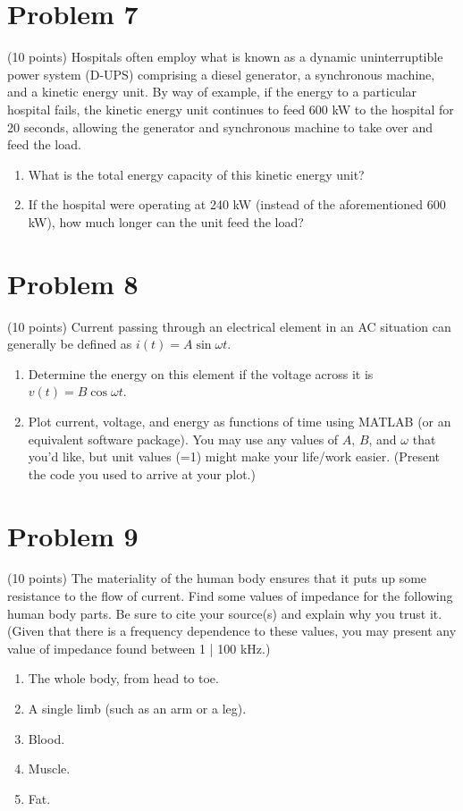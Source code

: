 \documentclass[11pt]{book}
\begin{document}
\section{Problem 7}
(10 points) Hospitals often employ what is known as a dynamic uninterruptible power system (D-UPS) comprising a diesel generator, a synchronous machine, and a kinetic energy unit. By way of example, if the energy to a particular hospital fails, the kinetic energy unit continues to feed 600 kW to the hospital for 20 seconds, allowing the generator and synchronous machine to take over and feed the load.
\begin{enumerate}
	\item What is the total energy capacity of this kinetic energy unit?
	\item If the hospital were operating at 240 kW (instead of the aforementioned 600 kW), how much longer can the unit feed the load?
\end{enumerate}


\section{Problem 8}
(10 points) Current passing through an electrical element in an AC situation can generally be defined as $i(t) = A \sin \omega t$. 
\begin{enumerate}
	\item Determine the energy on this element if the voltage across it is 
\\
$v(t) = B \cos \omega t$.
	\item Plot current, voltage, and energy as functions of time using MATLAB (or an equivalent software package). You may use any values of $A$, $B$, and $\omega$ that you’d like, but unit values (=1) might make your life/work easier. (Present the code you used to arrive at your plot.)
\end{enumerate}


\section{Problem 9}
(10 points) The materiality of the human body ensures that it puts up some resistance to the flow of current. Find some values of impedance for the following human body parts. Be sure to cite your source(s) and explain why you trust it. (Given that there is a frequency dependence to these values, you may present any value of impedance found between 1 | 100 kHz.)
\begin{enumerate}
	\item The whole body, from head to toe.
	\item A single limb (such as an arm or a leg).
	\item Blood.
	\item Muscle.
	\item Fat.
\end{enumerate}
\end{document}
